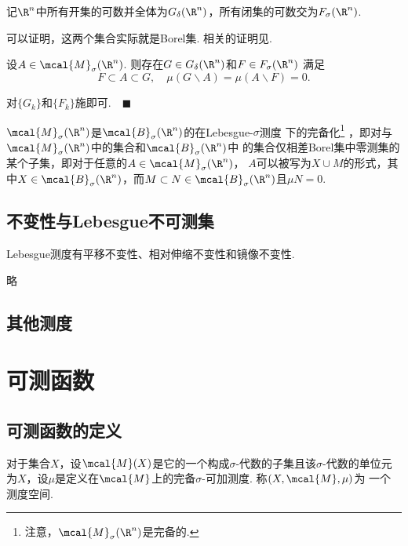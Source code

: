   \begin{defi}
    记$\R^n$中所有开集的可数并全体为$G_\delta(\R^n)$，所有闭集的可数交为$F_\sigma(\R^n)$.
  \end{defi}
  \remark
    可以证明，这两个集合实际就是Borel集. 相关的证明见.

  \begin{thm}
    \label{thm: sigma-可测、开集、闭集}
    设$A\in\mcal{M}_\sigma(\R^n)$. 则存在$G\in G_\delta(\R^n)$和$F\in F_\sigma(\R^n)$
    满足
    \[
      F\subset A\subset G,\quad \mu(G\backslash A) = \mu(A\backslash F) = 0.
    \]
  \end{thm}
  \proof
    对$\{ G_k\}$和$\{ F_k\}$施即可.$\quad\blacksquare$

  \begin{cor}
    $\mcal{M}_\sigma(\R^n)$是$\mcal{B}_\sigma(\R^n)$的在Lebesgue-$\sigma$测度
    下的完备化\footnote{注意，$\mcal{M}_\sigma(\R^n)$是完备的.}
    ，即对与$\mcal{M}_\sigma(\R^n)$中的集合和$\mcal{B}_\sigma(\R^n)$中
    的集合仅相差Borel集中零测集的某个子集，即对于任意的$A\in\mcal{M}_\sigma(\R^n)$，
    $A$可以被写为$X\cup M$的形式，其中$X\in\mcal{B}_\sigma(\R^n)$，而$M\subset N
    \in\mcal{B}_\sigma(\R^n)$且$\mu N=0$.
  \end{cor}

\subsection{不变性与Lebesgue不可测集}

  \begin{thm}
    Lebesgue测度有平移不变性、相对伸缩不变性和镜像不变性.
  \end{thm}

  \begin{thm}[Lebesgue不可测集]
    略
  \end{thm}

\subsection{其他测度}



\newpage
\section{可测函数}

\subsection{可测函数的定义}
   \begin{defi}[测度空间]
     对于集合$X$，设$\mcal{M}(X)$是它的一个构成$\sigma$-代数的子集且该$\sigma$-代数的单位元
     为$X$，设$\mu$是定义在$\mcal{M}$上的完备$\sigma$-可加测度. 称$(X, \mcal{M}, \mu)$为
     一个测度空间.
   \end{defi}

